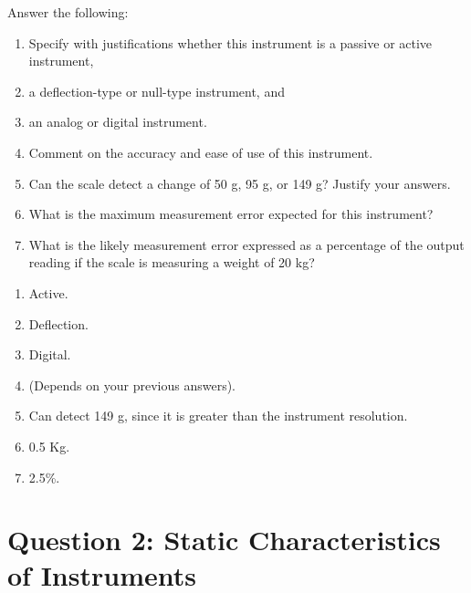 \documentclass[a4paper,11pt,dvipsnames]{book}
\begin{document}
\begin{question}
Answer the following: 
\begin{enumerate}
\item Specify with justifications whether this instrument is a passive or active instrument, 
\item a deflection-type or null-type instrument, and 
\item an analog or digital instrument. 
\item Comment on the accuracy and ease of use of this instrument. 
\item Can the scale detect a change of 50 g, 95 g, or 149 g? Justify your answers.
\item What is the maximum measurement error expected for this instrument?
\item What is the likely measurement error expressed as a percentage of the output reading if the scale is measuring a weight of 20 kg?
\end{enumerate}



\end{question}
\begin{solution}
\begin{enumerate}
\item Active.
\item Deflection.
\item Digital.
\item (Depends on your previous answers).
\item Can detect 149 g, since it is greater than the instrument resolution.
\item 0.5 Kg.
\item 2.5\%.
\end{enumerate}
\end{solution}


\chapter*{Question 2: Static Characteristics of Instruments}
\end{document}
